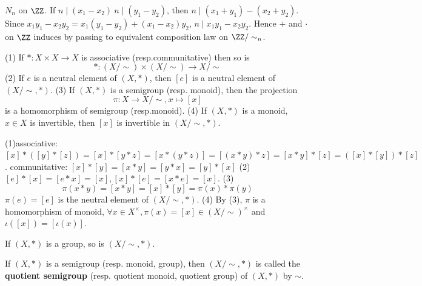\begin{exampleenv}
    $N_n$ on $\ZZ$. 
    \newline
    If $n\mid (x_1-x_2)\ n\mid (y_1-y_2)$,  then $n\mid(x_1+y_1)-(x_2+y_2)$.
    \newline
    Since $x_1y_1-x_2y_2=x_1(y_1-y_2)+(x_1-x_2)y_2$,  $n\mid x_1y_1-x_2y_2$.
    \newline
    Hence $+$ and $\cdot$ on $\ZZ$ induces by passing to equivalent composition law on $\ZZ/\sim_n$.
\end{exampleenv}
\begin{propositionenv}
    \quad\newline
    (1) If $*:X\times X\rightarrow X$ is associative (resp.communitative) then so is $$*:(X/\sim)\times(X/\sim)\rightarrow X/\sim$$
    (2) If $e$ is a neutral element of $(X, *)$,  then $[e]$ is a neutral element of $(X/\sim, *)$.
    \newline
    (3) If $(X, *)$ is a semigroup (resp. monoid),  then the projection $$\pi:X\rightarrow X/\sim,  x\mapsto[x]$$ is a homomorphism of  semigroup (resp.monoid).
    \newline
    (4) If $(X, *)$ is a monoid,  $x\in X$ is invertible,  then $[x]$ is invertible in $(X/\sim, *)$.
\end{propositionenv}
\begin{proofenv}
    \quad
    \newline
    (1)associative:
     $[x]*([y]*[z])=[x]*[y*z]=[x*(y*z)]=[(x*y)*z]=[x*y]*[z]=([x]*[y])*[z]$.
    \newline
    communitative:
    $[x]*[y]=[x*y]=[y*x]=[y]*[x]$
    \newline
    (2) $[e]*[x]=[e*x]=[x], [x]*[e]=[x*e]=[x]$.
    \newline
    (3) $$\pi(x*y)=[x*y]=[x]*[y]=\pi(x)*\pi(y)$$
    $\pi(e)=[e]$ is the neutral element of $(X/\sim, *)$.
    \newline
    (4) By (3),  $\pi$ is a homomorphism of monoid,  $\forall x \in X^\times,  \pi(x)=[x]\in (X/\sim )^\times $ and $\iota([x])=[\iota(x)]$.
\end{proofenv}
\begin{remark}
    If $(X, *)$ is a group,  so is $(X/\sim, *)$.
\end{remark}
\begin{definitionenv}
    \quad
    \newline
    If $(X, *)$ is a semigroup (resp. monoid,  group),  then $(X/\sim,  *)$ is called the \textbf{quotient semigroup} (resp. quotient monoid,  quotient group) of $(X, *)$ by $\sim$.
\end{definitionenv}
